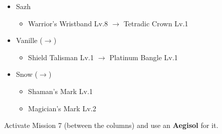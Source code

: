 \begin{menu}
\begin{itemize}
		\equip
		\begin{itemize}
			\item Sazh
				\begin{itemize}
					\item Warrior's Wristband Lv.8 $\rightarrow$ Tetradic Crown Lv.1
				\end{itemize}
			\item Vanille ($\rightarrow$)
			    \begin{itemize}
					\item Shield Talisman Lv.1 $\rightarrow$ Platinum Bangle Lv.1
			    \end{itemize}
			\item Snow ($\rightarrow$)
			    \begin{itemize}
				    \item Shaman's Mark Lv.1
				    \item Magician's Mark Lv.2
			    \end{itemize}
		\end{itemize}
	\end{itemize}
\end{menu}

\renewcommand{\first}{[1] Hero's Charge (\syn/\med/\com)}
\renewcommand{\second}{[2] Tri-Disaster (\rav/\rav/\rav)}
\renewcommand{\third}{[3] Thaumaturgy (\rav/\med/\rav)}
\renewcommand{\fourth}{[4] Smart Bomb (\rav/\sab/\rav)}
\renewcommand{\fifth}{[5] Aggression (\com/\rav/\com)}
\renewcommand{\sixth}{[6] Mystic Tower (\rav/\rav/\sen)}

Activate Mission 7 (between the columns) and use an \textbf{Aegisol} for it.

